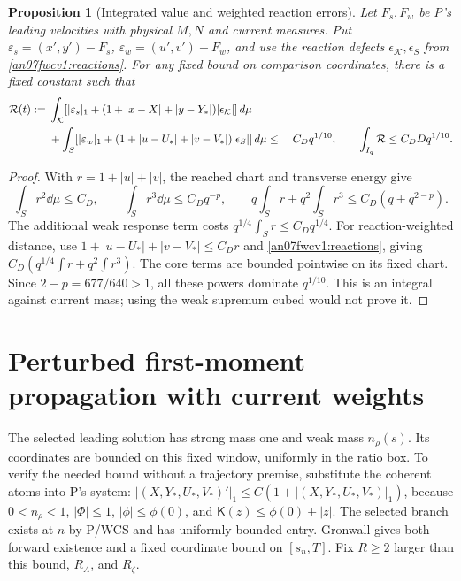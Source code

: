 \documentclass[11pt]{article}
\numberwithin{equation}{section}
\newtheorem{proposition}[theorem]{Proposition}
\newcommand{\KK}{\mathcal K}\newcommand{\BB}{\mathcal B}
\newcommand{\Kfun}{\mathsf K}\newcommand{\Ffun}{\mathsf F}
\begin{document}
\begin{proposition}[Integrated value and weighted reaction errors]
\label{an07fwcv1:errors}
Let \(F_s,F_w\) be P's leading velocities with physical
\(M,N\) and current measures. Put
\(\varepsilon_s=(x',y')-F_s\),
\(\varepsilon_w=(u',v')-F_w\), and use the reaction defects
\(\epsilon_\KK,\epsilon_S\) from \eqref{an07fwcv1:reactions}.
For any fixed bound on comparison coordinates, there is a fixed
constant such that
\begin{align}
 \mathcal R(t):={}&\int_\KK
    [|\varepsilon_s|_1+(1+|x-X|+|y-Y_*|)|\epsilon_\KK|]\dd\mu
       \notag\\
 &+\int_S[|\varepsilon_w|_1+
          (1+|u-U_*|+|v-V_*|)|\epsilon_S|]\dd\mu
 \le{}&C_Dq^{1/10},\qquad
 \int_{I_q}\mathcal R\le C_DDq^{1/10}.
 \label{an07fwcv1:reductionnorm}
\end{align}
\end{proposition}
\begin{proof}
With \(r=1+|u|+|v|\), the reached chart and transverse energy give
\[
 \int_Sr^2\dd\mu\le C_D,\qquad
 \int_Sr^3\dd\mu\le C_Dq^{-p},\qquad
 q\int_Sr+q^2\int_Sr^3\le C_D(q+q^{2-p}).
\]
The additional weak response term costs
\(q^{1/4}\int_Sr\le C_Dq^{1/4}\).
For reaction-weighted distance, use
\(1+|u-U_*|+|v-V_*|\le C_Dr\) and
\eqref{an07fwcv1:reactions}, giving
\(C_D(q^{1/4}\int r+q^2\int r^3)\).
The core terms are bounded pointwise on its fixed chart.
Since \(2-p=677/640>1\), all these powers dominate
\(q^{1/10}\). This is an integral against current mass;
using the weak supremum cubed would not prove it.
\end{proof}

\section{Perturbed first-moment propagation with current weights}
\label{an07fwcv1:propagationsection}
The selected leading solution has strong mass one and weak mass
\(n_\rho(s)\). Its coordinates are bounded on this fixed window,
uniformly in the ratio box. To verify the needed bound without a
trajectory premise, substitute the coherent atoms into P's system:
\(|(X,Y_*,U_*,V_*)'|_1\le C(1+|(X,Y_*,U_*,V_*)|_1)\),
because \(0<n_\rho<1\), \(|\Phi|\le1\),
\(|\phi|\le\phi(0)\), and \(\Kfun(z)\le\phi(0)+|z|\).
The selected branch exists at \(n\) by P/WCS and has uniformly
bounded entry. Gronwall gives both forward existence and a fixed
coordinate bound on \([s_n,T]\).
Fix \(R\ge2\) larger than this bound, \(R_A\), and \(R_\zeta\).
\end{document}
